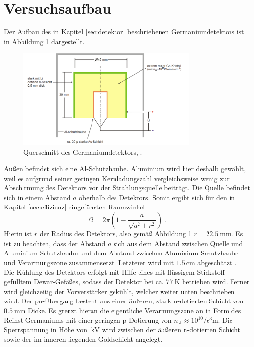 \section{Versuchsaufbau}
\label{sec:Versuchaufbau}
Der Aufbau des in Kapitel \ref{sec:detektor} beschriebenen Germaniumdetektors ist in Abbildung \ref{fig:aufbauDetektor} dargestellt.
\begin{figure}
  \centering
  \includegraphics[width=0.8\textwidth]{ressources/aufbauDetektor.png}
  \caption{Querschnitt des Germaniumdetektors, \cite{skript}.}
  \label{fig:aufbauDetektor}
\end{figure}
Außen befindet sich eine Al-Schutzhaube. Aluminium wird hier deshalb gewählt, weil es aufgrund seiner geringen Kernladungszahl vergleichsweise wenig zur Abschirmung des Detektors vor der Strahlungsquelle beiträgt. Die Quelle befindet sich in einem Abstand $a$ oberhalb des Detektors. Somit ergibt sich für den in Kapitel \ref{sec:effizienz} eingeführten Raumwinkel
\begin{equation}
  \Omega = 2\pi \left( 1 - \frac{a}{\sqrt{a^2+r^2}} \right) \; .
  \label{eq:raumwinkel}
\end{equation}
Hierin ist $r$ der Radius des Detektors, also gemäß Abbildung \ref{fig:aufbauDetektor} $r=\SI{22.5}{\milli\meter}$. Es ist zu beachten, dass der Abstand $a$ sich aus dem Abstand zwischen Quelle und Aluminium-Schutzhaube und dem Abstand zwischen Aluminium-Schutzhaube und Verarmungszone zusammensetzt. Letzterer wird mit $\SI{1.5}{\centi\meter}$ abgeschätzt \cite{skript}.\\
Die Kühlung des Detektors erfolgt mit Hilfe eines mit flüssigem Stickstoff gefülltem Dewar-Gefäßes, sodass der Detektor bei ca. $\SI{77}{\kelvin}$ betrieben wird. Ferner wird gleichzeitig der Vorverstärker gekühlt, welcher weiter unten beschrieben wird. Der pn-Übergang besteht aus einer äußeren, stark n-dotierten Schicht von $\SI{0.5}{\milli\meter}$ Dicke. Es grenzt hieran die eigentliche Verarmungszone an in Form des Reinst-Germaniums mit einer geringen p-Dotierung von $n_A\approx10^{10}\si{\per\cubic\centi\meter}$. Die Sperrspannung in Höhe von $\SI{}{\kilo\volt}$ wird zwischen der äußeren n-dotierten Schicht sowie der im inneren liegenden Goldschicht angelegt.\\
